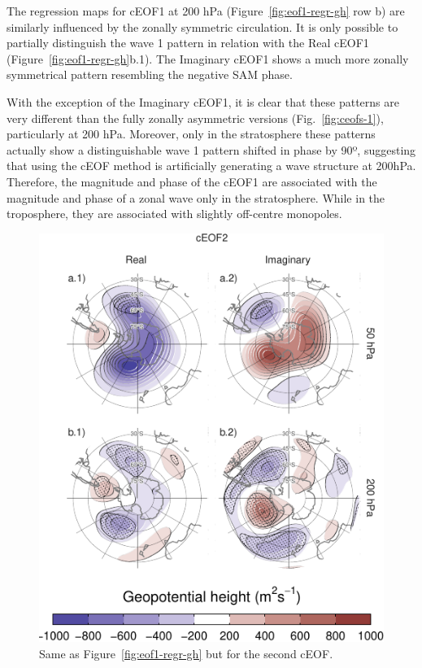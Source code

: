 \documentclass[smallextended]{svjour3}       %
\begin{document}
The regression maps for cEOF1 at 200 hPa (Figure~\ref{fig:eof1-regr-gh} row b) are similarly influenced by the zonally symmetric circulation.
It is only possible to partially distinguish the wave 1 pattern in relation with the Real cEOF1 (Figure~\ref{fig:eof1-regr-gh}b.1).
The Imaginary cEOF1 shows a much more zonally symmetrical pattern resembling the negative SAM phase.

With the exception of the Imaginary cEOF1, it is clear that these patterns are very different than the fully zonally asymmetric versions (Fig.~\ref{fig:ceofs-1}), particularly at 200 hPa.
Moreover, only in the stratosphere these patterns actually show a distinguishable wave 1 pattern shifted in phase by 90º, suggesting that using the cEOF method is artificially generating a wave structure at 200hPa.
Therefore, the magnitude and phase of the cEOF1 are associated with the magnitude and phase of a zonal wave only in the stratosphere.
While in the troposphere, they are associated with slightly off-centre monopoles.



\begin{figure}
\centering
\includegraphics{../figures/eof2-regr-gh-1.pdf}
\caption{\label{fig:eof2-regr-gh}Same as Figure~\ref{fig:eof1-regr-gh} but for the second cEOF.}
\end{figure}
\end{document}
